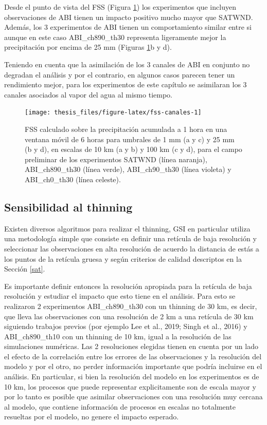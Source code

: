 \documentclass[12pt,oneside,a4paper]{reedthesis}
\begin{document}
Desde el punto de vista del FSS (Figura \ref{fig:fss-canales}) los experimentos que incluyen observaciones de ABI tienen un impacto positivo mucho mayor que SATWND. Además, los 3 experimentos de ABI tienen un comportamiento similar entre si aunque en este caso ABI\_ch890\_th30 representa ligeramente mejor la precipitación por encima de 25 mm (Figuras \ref{fig:fss-canales}b y d).

Teniendo en cuenta que la asimilación de los 3 canales de ABI en conjunto no degradan el análisis y por el contrario, en algunos casos parecen tener un rendimiento mejor, para los experimentos de este capítulo se asimilaran los 3 canales asociados al vapor del agua al mismo tiempo.


\begin{figure}
\texttt{[image: thesis\_files/figure-latex/fss-canales-1]} \caption{FSS calculado sobre la precipitación acumulada a 1 hora en una ventana móvil de 6 horas para umbrales de 1 mm (a y c) y 25 mm (b y d), en escalas de 10 km (a y b) y 100 km (c y d), para el campo preliminar de los experimentos SATWND (línea naranja), ABI\_ch890\_th30 (línea verde), ABI\_ch90\_th30 (línea violeta) y ABI\_ch0\_th30 (línea celeste).}\label{fig:fss-canales}
\end{figure}
\hypertarget{thinning}{%
\subsection{Sensibilidad al thinning}\label{thinning}}

Existen diversos algoritmos para realizar el thinning, GSI en particular utiliza una metodología simple que consiste en definir una retícula de baja resolución y seleccionar las observaciones en alta resolución de acuerdo la distancia de estás a los puntos de la retícula gruesa y según criterios de calidad descriptos en la Sección \ref{sat}.

Es importante definir entonces la resolución apropiada para la retícula de baja resolución y estudiar el impacto que esto tiene en el análisis. Para esto se realizaron 2 experimentos ABI\_ch890\_th30 con un thinning de 30 km, es decir, que lleva las observaciones con una resolución de 2 km a una retícula de 30 km siguiendo trabajos previos (por ejemplo Lee et al., 2019; Singh et al., 2016) y ABI\_ch890\_th10 con un thinning de 10 km, igual a la resolución de las simulaciones numéricas. Las 2 resoluciones elegidas tienen en cuenta por un lado el efecto de la correlación entre los errores de las observaciones y la resolución del modelo y por el otro, no perder información importante que podría incluirse en el análisis. En particular, si bien la resolución del modelo en los experimentos es de 10 km, los procesos que puede representar explicitamente son de escala mayor y por lo tanto es posible que asimilar observaciones con una resolución muy cercana al modelo, que contiene información de procesos en escalas no totalmente resueltas por el modelo, no genere el impacto esperado.
\end{document}
